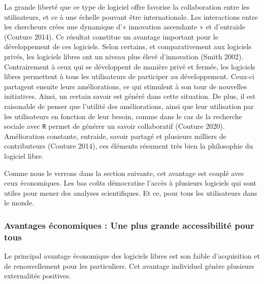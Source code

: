 \documentclass[
  letterpaper,
]{scrbook}
\begin{document}
La grande liberté que ce type de logiciel offre favorise la
collaboration entre les utilisateurs, et ce à une échelle pouvant être
internationale. Les interactions entre les chercheurs crées une
dynamique d'« innovation ascendante » et d'entraide (Couture 2014). Ce
résultat constitue un avantage important pour le développement de ces
logiciels. Selon certains, et comparativement aux logiciels privés, les
logiciels libres ont un niveau plus élevé d'innovation (Smith 2002).
Contrairement à ceux qui se développent de manière privé et fermée, les
logiciels libres permettent à tous les utilisateurs de participer au
développement. Ceux-ci partagent ensuite leurs améliorations, ce qui
stimulent à son tour de nouvelles initiatives. Ainsi, un certain savoir
est généré dans cette situation. De plus, il est raisonable de penser
que l'utilité des améliorations, ainsi que leur utilisation par les
utilisateurs en fonction de leur besoin, comme dans le cas de la
recherche sociale avec \texttt{R} permet de générer un savoir
collaboratif (Couture 2020). Amélioration constante, entraide, savoir
partagé et plusieurs milliers de contributeurs (Couture 2014), ces
éléments résument très bien la philosophie du logiciel libre.

Comme nous le verrons dans la section suivante, cet avantage est couplé
avec ceux économiques. Les bas coûts démocratise l'accès à plusieurs
logiciels qui sont utiles pour mener des analyses scientifiques. Et ce,
pour tous les utilisateurs dans le monde.

\hypertarget{avantages-uxe9conomiques-une-plus-grande-accessibilituxe9-pour-tous}{%
\subsubsection{Avantages économiques : Une plus grande accessibilité
pour
tous}\label{avantages-uxe9conomiques-une-plus-grande-accessibilituxe9-pour-tous}}

Le principal avantage économique des logiciels libres est son faible
d'acquisition et de renouvellement pour les particuliers. Cet avantage
individuel génère plusieurs externalités positives.
\end{document}
